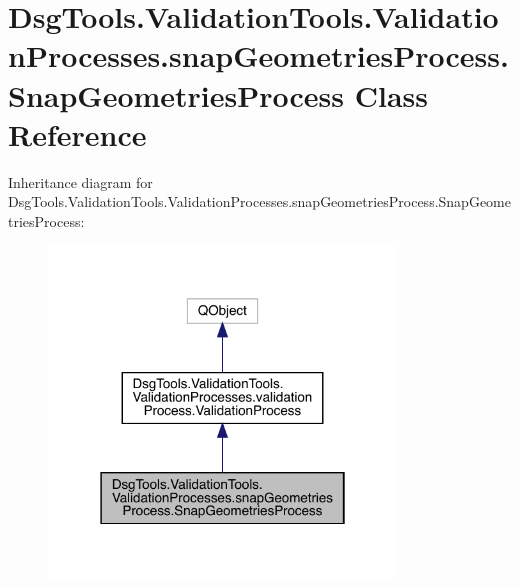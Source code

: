 \hypertarget{class_dsg_tools_1_1_validation_tools_1_1_validation_processes_1_1snap_geometries_process_1_1_snap_geometries_process}{}\section{Dsg\+Tools.\+Validation\+Tools.\+Validation\+Processes.\+snap\+Geometries\+Process.\+Snap\+Geometries\+Process Class Reference}
\label{class_dsg_tools_1_1_validation_tools_1_1_validation_processes_1_1snap_geometries_process_1_1_snap_geometries_process}


Inheritance diagram for Dsg\+Tools.\+Validation\+Tools.\+Validation\+Processes.\+snap\+Geometries\+Process.\+Snap\+Geometries\+Process\+:
\nopagebreak
\begin{figure}[H]
\begin{center}
\leavevmode
\includegraphics[width=262pt]{class_dsg_tools_1_1_validation_tools_1_1_validation_processes_1_1snap_geometries_process_1_1_sna822c4d3cee8e5164ce3a746f998ff1e7}
\end{center}
\end{figure}


